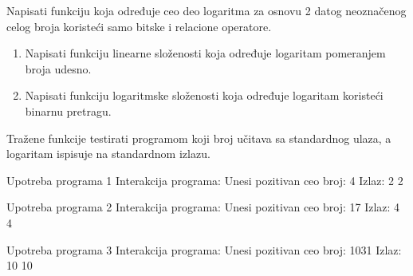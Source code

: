 \begin{Answer}[ref=408]
\end{Answer}
\begin{Exercise}[label=409]
  Napisati funkciju koja određuje ceo deo logaritma za osnovu 2 datog
  neoznačenog celog broja koristeći samo bitske i relacione
  operatore.
  \begin{enumerate}
  \item Napisati funkciju linearne složenosti koja određuje
    logaritam pomeranjem broja udesno.
  \item Napisati funkciju logaritmske složenosti koja određuje
    logaritam koristeći binarnu pretragu.
  \end{enumerate}
  Tražene funkcije testirati programom koji broj učitava sa
  standardnog ulaza, a logaritam ispisuje na standardnom izlazu.

\begin{minitest}
\begin{test}{Upotreba programa 1}
Interakcija programa:    
  Unesi pozitivan ceo
  broj: 4
Izlaz:
  2 2
\end{test}
\end{minitest}
\begin{minitest}
\begin{test}{Upotreba programa 2}
Interakcija programa:    
  Unesi pozitivan ceo
  broj: 17
Izlaz:
  4 4
\end{test}
\end{minitest}
\begin{minitest}
\begin{test}{Upotreba programa 3}
Interakcija programa:    
  Unesi pozitivan ceo
  broj: 1031
Izlaz:
  10 10
\end{test}
\end{minitest}


\end{Exercise}

